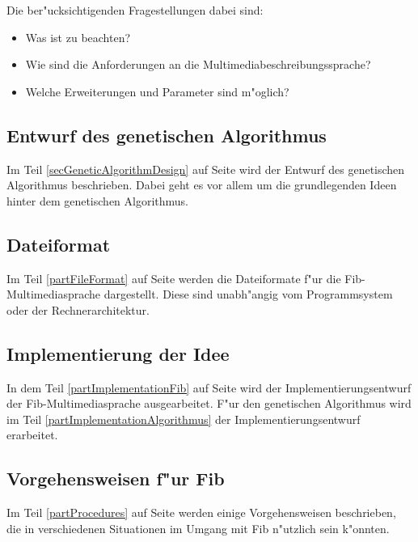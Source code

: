\documentclass[11pt,a4paper]{article}
\begin{document}
\bigskip\noindent
Die ber"ucksichtigenden Fragestellungen dabei sind:
\begin{itemize}
 \item Was ist zu beachten?
 \item Wie sind die Anforderungen an die Multimediabeschreibungssprache?
 \item Welche Erweiterungen und Parameter sind m"oglich?
\end{itemize}


\subsection{Entwurf des genetischen Algorithmus}

Im Teil \ref{secGeneticAlgorithmDesign} auf Seite \pageref{secGeneticAlgorithmDesign} wird der Entwurf des genetischen Algorithmus beschrieben. Dabei geht es vor allem um die grundlegenden Ideen hinter dem genetischen Algorithmus.


\subsection{Dateiformat}

Im Teil \ref{partFileFormat} auf Seite \pageref{partFileFormat} werden die Dateiformate f"ur die Fib-Multimediasprache dargestellt. Diese sind unabh"angig vom Programmsystem oder der Rechnerarchitektur.


\subsection{Implementierung der Idee}

In dem Teil \ref{partImplementationFib} auf Seite \pageref{partImplementationFib} wird der Implementierungsentwurf der Fib-Multi\-media\-sprache ausgearbeitet.
F"ur den genetischen Algorithmus wird im Teil \ref{partImplementationAlgorithmus} der Implementierungsentwurf erarbeitet.


\subsection{Vorgehensweisen f"ur Fib}

Im Teil \ref{partProcedures} auf Seite \pageref{partProcedures} werden einige Vorgehensweisen beschrieben, die in verschiedenen Situationen im Umgang mit Fib n"utzlich sein k"onnten.

%
\end{document}
